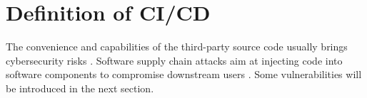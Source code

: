 \section{Definition of CI/CD}




The convenience and capabilities of the third-party source code usually 
brings cybersecurity risks \cite{mastrangelo2015use}. Software supply 
chain attacks aim at injecting code into software components to compromise
downstream users \cite{ladisa2023sok}. Some vulnerabilities will be introduced 
in the next section.